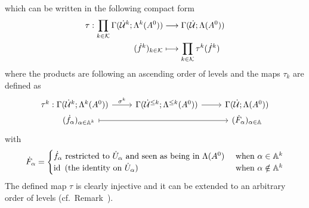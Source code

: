 \begin{prop}
  which can be written in the following compact form
  \begin{align*}
    \tau:\prod_{k\in\mathcal{K}}\Gamma(\dot {\mathcal{U}}^k;\Lambda^k(A^0))
    &\longrightarrow
    \Gamma(\dot{\mathcal{U}};\Lambda(A^0))
  \\(\dot f^k)_{k\in\mathcal{K}}
    &\longmapsto
    \prod_{k\in\mathcal{K}}\tau^k(\dot f^k)
  \end{align*}
  where the products are following an ascending order of levels and the maps
  $\tau_k$ are defined as
  \[ \begin{tikzcd}[row sep=0cm]
    \tau^k:\Gamma(\dot\cU^k;\Lambda^k(A^0))
    \arrow{r}{\sigma^k}&
    \Gamma(\dot\cU^{\leq k};\Lambda^{\leq k}(A^0))
    \rar &
    \Gamma(\dot\cU;\Lambda(A^0))
  \\~~~(\dot f_\alpha)_{\alpha\in\A^k}
    \arrow[|->]{rr}
    &&
    (\dot F_\alpha)_{\alpha\in\A}
  \end{tikzcd} \]
  with
  \[
    \dot F_\alpha=\begin{cases}
      \dot f_\alpha \text{~restricted to } \dot U_\alpha
      \text{~and seen as being in } \Lambda(A^0)
      & \text{~when } \alpha\in\mathbb{A}^k
    \\\operatorname{id} \text{~(the identity on $\dot U_\alpha$) }
      & \text{~when } \alpha\notin\mathbb{A}^k
    \end{cases}
  \]
  The defined map $\tau$ is clearly injective and it can be extended to an
  arbitrary order of levels (cf.\ Remark~\cite[Rem.II.3.5]{Loday1994}).
\end{prop}
